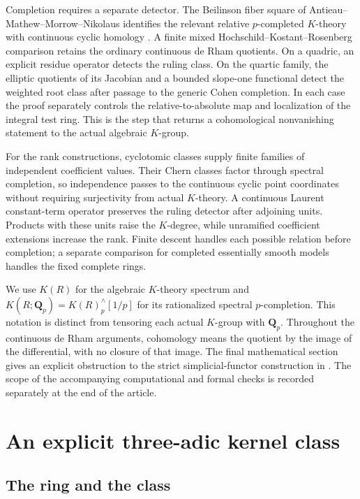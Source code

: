 \documentclass[11pt,a4paper]{amsart}
\numberwithin{equation}{section}
\theoremstyle{definition}
\theoremstyle{remark}
\newcommand{\Q}{\mathbf Q}
\begin{document}
Completion requires a separate detector. The Beilinson fiber square
of Antieau--Mathew--Morrow--Nikolaus identifies the relevant relative
$p$-completed $K$-theory with continuous cyclic homology
\cite{AMMN}. A finite mixed Hochschild--Kostant--Rosenberg comparison
retains the ordinary continuous de Rham quotients. On a quadric, an
explicit residue operator detects the ruling class. On the quartic
family, the elliptic quotients of its Jacobian and a bounded
slope-one functional detect the weighted root class after passage to
the generic Cohen completion. In each case the proof separately
controls the relative-to-absolute map and localization of the
integral test ring. This is the step that returns a cohomological
nonvanishing statement to the actual algebraic $K$-group.

For the rank constructions, cyclotomic classes supply finite families
of independent coefficient values. Their Chern classes factor through
spectral completion, so independence passes to the continuous cyclic
point coordinates without requiring surjectivity from actual
$K$-theory. A continuous Laurent constant-term operator preserves the
ruling detector after adjoining units. Products with these units raise
the $K$-degree, while unramified coefficient extensions increase the
rank. Finite descent handles each possible relation before completion;
a separate comparison for completed essentially smooth models handles
the fixed complete rings.

We use $K(R)$ for the algebraic $K$-theory spectrum and
$K(R;\Q_p)=K(R)^{\wedge}_p[1/p]$ for its rationalized spectral
$p$-completion. This notation is distinct from tensoring each actual
$K$-group with $\Q_p$. Throughout the continuous de Rham arguments,
cohomology means the quotient by the image of the differential, with
no closure of that image.
The final mathematical section gives an explicit obstruction to the
strict simplicial-functor construction in
\cite[Lemma~13(III)]{MochizukiParameters}.
The scope of the accompanying computational and formal checks is
recorded separately at the end of the article.



\section{An explicit three-adic kernel class}
\label{sec:explicit-core}
\subsection{The ring and the class}\label{c3:sec:introduction}
\end{document}
